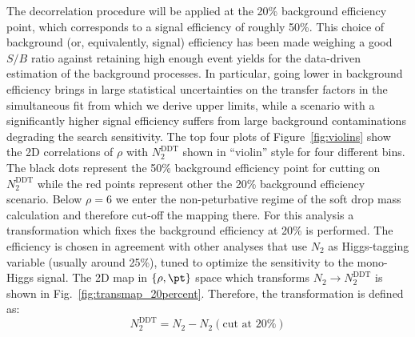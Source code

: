 The decorrelation procedure will be applied at the 20\% background efficiency point, which corresponds to a signal efficiency of roughly 50\%.
This choice of background (or, equivalently, signal) efficiency has been made weighing a good $S/B$ ratio against retaining high enough event yields for the data-driven estimation of the background processes. In particular, going lower in background efficiency brings in large statistical uncertainties on the transfer factors in the simultaneous fit from which we derive upper limits, while a scenario with a significantly higher signal efficiency suffers from large background contaminations degrading the search sensitivity.
The top four plots of Figure~\ref{fig:violins} show the 2D correlations of $\rho$ with $N_2^\text{DDT}$ shown in ``violin'' style for four different \pt bins.
The black dots represent the 50\% background efficiency point for cutting on $N_2^\text{DDT}$ while the red points represent other
the 20\% background efficiency scenario.
Below $\rho = 6$ we enter the non-peturbative regime of the soft drop mass calculation and therefore cut-off the mapping there.
For this analysis a transformation which fixes the background efficiency at 20\% is performed. The efficiency is chosen in agreement with other analyses that use $N_2$ as Higgs-tagging variable (usually around 25\%), tuned to optimize the sensitivity to the mono-Higgs signal.  
The 2D map in $\{\rho,\pt\}$ space which transforms $N_2 \rightarrow N_2^\text{DDT}$ is shown in Fig.~\ref{fig:transmap_20percent}.
Therefore, the transformation is defined as:
\begin{equation}
N_2^\text{DDT} = N_2 - N_2(\text{cut at 20\%})
\end{equation}

